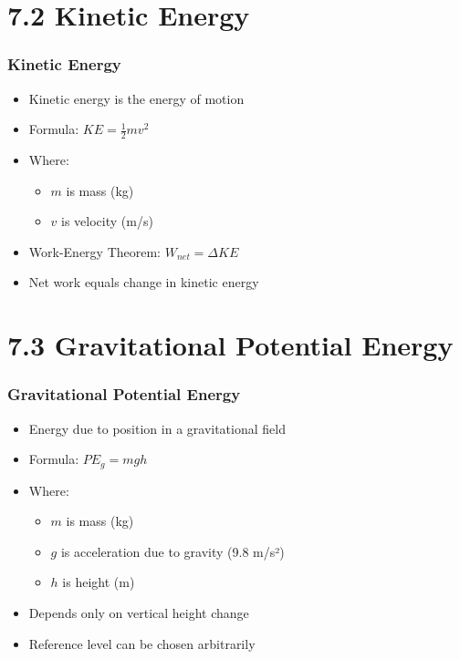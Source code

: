 \documentclass{beamer}
\begin{document}
\section{7.2 Kinetic Energy}

\begin{frame}
\frametitle{Kinetic Energy}
\begin{itemize}
    \item Kinetic energy is the energy of motion
    \item Formula: $KE = \frac{1}{2}mv^2$
    \item Where:
    \begin{itemize}
        \item $m$ is mass (kg)
        \item $v$ is velocity (m/s)
    \end{itemize}
    \item Work-Energy Theorem: $W_{net} = \Delta KE$
    \item Net work equals change in kinetic energy
\end{itemize}
\end{frame}

\section{7.3 Gravitational Potential Energy}

\begin{frame}
\frametitle{Gravitational Potential Energy}
\begin{itemize}
    \item Energy due to position in a gravitational field
    \item Formula: $PE_g = mgh$
    \item Where:
    \begin{itemize}
        \item $m$ is mass (kg)
        \item $g$ is acceleration due to gravity (9.8 m/s²)
        \item $h$ is height (m)
    \end{itemize}
    \item Depends only on vertical height change
    \item Reference level can be chosen arbitrarily
\end{itemize}
\end{frame}
\end{document}
